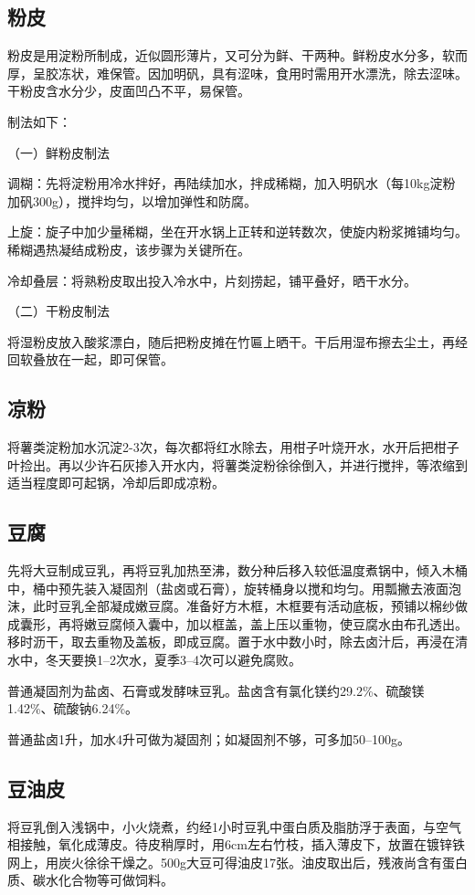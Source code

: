\documentclass{ctexbook}
\begin{document}
\subsection{粉皮}
粉皮是用淀粉所制成，近似圆形薄片，又可分为鲜、干两种。鲜粉皮水分多，软而厚，呈胶冻状，难保管。因加明矾，具有涩味，食用时需用开水漂洗，除去涩味。干粉皮含水分少，皮面凹凸不平，易保管。

制法如下：

（一）鲜粉皮制法

调糊：先将淀粉用冷水拌好，再陆续加水，拌成稀糊，加入明矾水（每10kg淀粉加矾300g），搅拌均匀，以增加弹性和防腐。

上旋：旋子中加少量稀糊，坐在开水锅上正转和逆转数次，使旋内粉浆摊铺均匀。稀糊遇热凝结成粉皮，该步骤为关键所在。

冷却叠层：将熟粉皮取出投入冷水中，片刻捞起，铺平叠好，晒干水分。

（二）干粉皮制法

将湿粉皮放入酸浆漂白，随后把粉皮摊在竹匾上晒干。干后用湿布擦去尘土，再经回软叠放在一起，即可保管。
\subsection{凉粉}
将薯类淀粉加水沉淀2-3次，每次都将红水除去，用柑子叶烧开水，水开后把柑子叶捡出。再以少许石灰掺入开水内，将薯类淀粉徐徐倒入，并进行搅拌，等浓缩到适当程度即可起锅，冷却后即成凉粉。
\subsection{豆腐}
先将大豆制成豆乳，再将豆乳加热至沸，数分种后移入较低温度煮锅中，倾入木桶中，桶中预先装入凝固剂（盐卤或石膏），旋转桶身以搅和均匀。用瓢撇去液面泡沫，此时豆乳全部凝成嫩豆腐。准备好方木框，木框要有活动底板，预铺以棉纱做成囊形，再将嫩豆腐倾入囊中，加以框盖，盖上压以重物，使豆腐水由布孔透出。移时沥干，取去重物及盖板，即成豆腐。置于水中数小时，除去卤汁后，再浸在清水中，冬天要换1--2次水，夏季3--4次可以避免腐败。

普通凝固剂为盐卤、石膏或发酵味豆乳。盐卤含有氯化镁约29.2\%、硫酸镁1.42\%、硫酸钠6.24\%。

普通盐卤1升，加水4升可做为凝固剂；如凝固剂不够，可多加50--100g。
\subsection{豆油皮}
将豆乳倒入浅锅中，小火烧煮，约经1小时豆乳中蛋白质及脂肪浮于表面，与空气相接触，氧化成薄皮。待皮稍厚时，用6cm左右竹枝，插入薄皮下，放置在镀锌铁网上，用炭火徐徐干燥之。500g大豆可得油皮17张。油皮取出后，残液尚含有蛋白质、碳水化合物等可做饲料。
\end{document}
